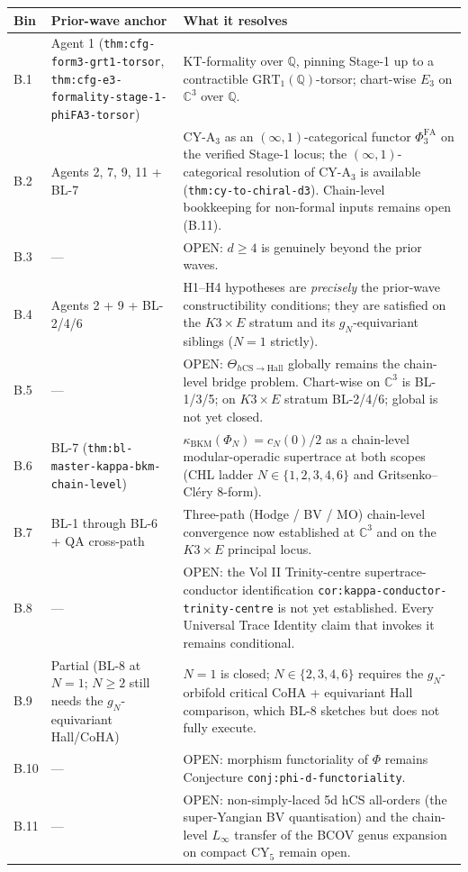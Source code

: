 \documentclass[11pt]{amsart}
\providecommand{\kBKM}{\kappa_{\mathrm{BKM}}}
\providecommand{\PhiFA}{\Phi^{\mathrm{FA}}}
\providecommand{\GRT}{\mathrm{GRT}}
\providecommand{\hCS}{h\mathrm{CS}}
\providecommand{\Hall}{\mathrm{Hall}}
\providecommand{\Q}{\mathbb{Q}}
\providecommand{\C}{\mathbb{C}}
\begin{document}
\begin{center}
\small
\begin{tabular}{@{}llp{6.5cm}@{}}
\toprule
Bin & Prior-wave anchor & What it resolves \\
\midrule
B.1  & Agent 1 (\texttt{thm:cfg-form3-grt1-torsor}, \texttt{thm:cfg-e3-formality-stage-1-phiFA3-torsor}) & KT-formality over $\Q$, pinning Stage-1 up to a contractible $\GRT_1(\Q)$-torsor; chart-wise $E_3$ on $\C^3$ over $\Q$. \\
B.2  & Agents 2, 7, 9, 11 + BL-7 & CY-A$_3$ as an $(\infty,1)$-categorical functor $\PhiFA_3$ on the verified Stage-1 locus; the $(\infty,1)$-categorical resolution of CY-A$_3$ is available (\texttt{thm:cy-to-chiral-d3}). Chain-level bookkeeping for non-formal inputs remains open (B.11). \\
B.3  & --- & OPEN: $d \geq 4$ is genuinely beyond the prior waves. \\
B.4  & Agents 2 + 9 + BL-2/4/6 & H1--H4 hypotheses are \emph{precisely} the prior-wave constructibility conditions; they are satisfied on the $K3 \times E$ stratum and its $g_N$-equivariant siblings ($N = 1$ strictly). \\
B.5  & --- & OPEN: $\Theta_{\hCS \to \Hall}$ globally remains the chain-level bridge problem. Chart-wise on $\C^3$ is BL-1/3/5; on $K3 \times E$ stratum BL-2/4/6; global is not yet closed. \\
B.6  & BL-7 (\texttt{thm:bl-master-kappa-bkm-chain-level}) & $\kBKM(\Phi_N) = c_N(0)/2$ as a chain-level modular-operadic supertrace at both scopes (CHL ladder $N \in \{1,2,3,4,6\}$ and Gritsenko--Cl\'ery 8-form). \\
B.7  & BL-1 through BL-6 + QA cross-path & Three-path (Hodge / BV / MO) chain-level convergence now established at $\C^3$ and on the $K3 \times E$ principal locus. \\
B.8  & --- & OPEN: the Vol II Trinity-centre supertrace-conductor identification \texttt{cor:kappa-conductor-trinity-centre} is not yet established. Every Universal Trace Identity claim that invokes it remains conditional. \\
B.9  & Partial (BL-8 at $N = 1$; $N \geq 2$ still needs the $g_N$-equivariant Hall/CoHA) & $N = 1$ is closed; $N \in \{2, 3, 4, 6\}$ requires the $g_N$-orbifold critical CoHA + equivariant Hall comparison, which BL-8 sketches but does not fully execute. \\
B.10 & --- & OPEN: morphism functoriality of $\Phi$ remains Conjecture \texttt{conj:phi-d-functoriality}. \\
B.11 & --- & OPEN: non-simply-laced 5d hCS all-orders (the super-Yangian BV quantisation) and the chain-level $L_\infty$ transfer of the BCOV genus expansion on compact CY$_5$ remain open. \\
\bottomrule
\end{tabular}
\end{center}
\end{document}

